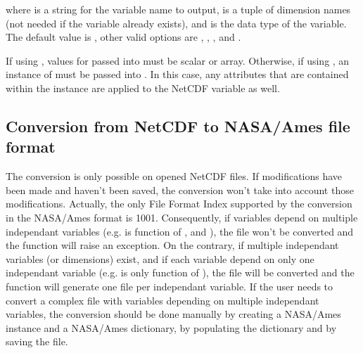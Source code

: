 \documentclass[a4paper,10pt,openany,english]{sphinxmanual}
\begin{document}
where  is a string for the variable name to output,  is a tuple of dimension names (not needed if the variable already exists), and  is the data type of the variable. The default value is , other valid options are , , ,  and .

If using {\hyperref[egadsapi:egads.input.netcdf_io.NetCdf]{}}, values for  passed into  must be scalar or array. Otherwise, if using {\hyperref[egadsapi:egads.input.netcdf_io.EgadsNetCdf]{}}, an instance of {\hyperref[egadsapi:egads.core.egads_core.EgadsData]{}} must be passed into . In this case, any attributes that are contained within the {\hyperref[egadsapi:egads.core.egads_core.EgadsData]{}} instance are applied to the NetCDF variable as well.


\subsection{Conversion from NetCDF to NASA/Ames file format}
\label{tutorial:conversion-from-netcdf-to-nasa-ames-file-format}
The conversion is only possible on opened NetCDF files. If modifications have been made and haven't been saved, the conversion won't take into account those modifications. Actually, the only File Format Index supported by the conversion in the NASA/Ames format is 1001. Consequently, if variables depend on multiple independant variables (e.g.  is function of ,  and ), the file won't be converted and the function will raise an exception. On the contrary, if multiple independant variables (or dimensions) exist, and if each variable depend on only one independant variable (e.g.  is only function of ), the file will be converted and the function will generate one file per independant variable. If the user needs to convert a complex file with variables depending on multiple independant variables, the conversion should be done manually by creating a NASA/Ames instance and a NASA/Ames dictionary, by populating the dictionary and by saving the file.
\end{document}
